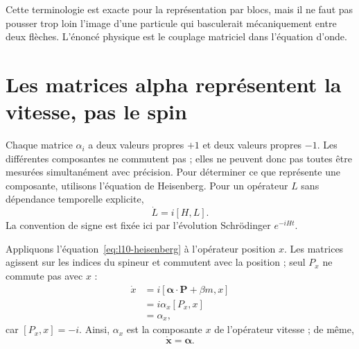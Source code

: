 Cette terminologie est exacte pour la représentation par blocs, mais il ne faut pas pousser trop loin l’image d’une particule qui basculerait mécaniquement entre deux flèches. L’énoncé physique est le couplage matriciel dans l’équation d’onde.

\begin{classroomqa}
\end{classroomqa}

\begin{classroomqa}
\end{classroomqa}

\section{Les matrices alpha représentent la vitesse, pas le spin}

Chaque matrice \(\alpha_i\) a deux valeurs propres \(+1\) et deux valeurs propres \(-1\). Les différentes composantes ne commutent pas ; elles ne peuvent donc pas toutes être mesurées simultanément avec précision. Pour déterminer ce que représente une composante, utilisons l’équation de Heisenberg. Pour un opérateur \(L\) sans dépendance temporelle explicite,
\begin{equation}
\dot L=i[H,L].
\label{eq:l10-heisenberg}
\end{equation}
La convention de signe est fixée ici par l’évolution Schr\"odinger \(e^{-iHt}\).

Appliquons l’équation~\eqref{eq:l10-heisenberg} à l’opérateur position \(x\). Les matrices agissent sur les indices du spineur et commutent avec la position ; seul \(P_x\) ne commute pas avec \(x\) :
\begin{align}
\dot x
&=i[\boldsymbol{\alpha}\cdot\mathbf P+\beta m,x]\\
&=i\alpha_x[P_x,x]\\
&=\alpha_x,
\label{eq:l10-velocity}
\end{align}
car \([P_x,x]=-i\). Ainsi, \(\alpha_x\) est la composante \(x\) de l’opérateur vitesse ; de même,
\begin{equation}
\dot{\mathbf x}=\boldsymbol{\alpha}.
\end{equation}

